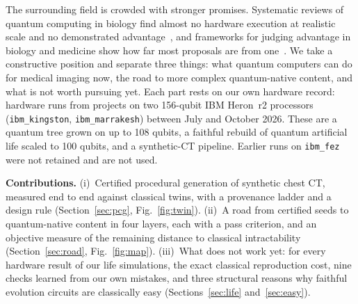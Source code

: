 \documentclass[conference]{IEEEtran}
\begin{document}
The surrounding field is crowded with stronger promises. Systematic reviews of quantum computing in biology find
almost no hardware execution at realistic scale and no demonstrated advantage~\cite{arcieri2026}, and frameworks for
judging advantage in biology and medicine show how far most proposals are from one~\cite{cordier2022}. We take a
constructive position and separate three things: what quantum computers can do for medical imaging now, the road
to more complex quantum-native content, and what is not worth pursuing yet. Each part rests on our own hardware
record: \nHwRunFiles{} hardware runs from \nHwProjects{} projects on two 156-qubit IBM Heron~r2 processors
(\texttt{ibm\_kingston}, \texttt{ibm\_marrakesh}) between July and October 2026. These are a quantum tree grown on up
to 108 qubits, a faithful rebuild of quantum artificial life scaled to 100 qubits, and a synthetic-CT pipeline. Earlier
runs on \texttt{ibm\_fez} were not retained and are not used.

\textbf{Contributions.}
(i)~Certified procedural generation of synthetic chest CT, measured end to end against classical twins, with a
provenance ladder and a design rule (Section~\ref{sec:pcg}, Fig.~\ref{fig:twin}).
(ii)~A road from certified seeds to quantum-native content in four layers, each with a pass criterion, and an
objective measure of the remaining distance to classical intractability (Section~\ref{sec:road}, Fig.~\ref{fig:map}).
(iii)~What does not work yet: for every hardware result of our life simulations, the exact classical reproduction
cost, nine checks learned from our own mistakes, and three structural reasons why faithful evolution circuits are
classically easy (Sections~\ref{sec:life} and~\ref{sec:easy}).
\end{document}

